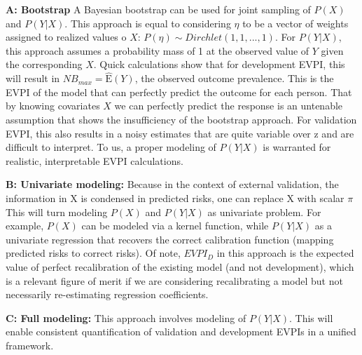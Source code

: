 \documentclass[
]{article}
\begin{document}
\textbf{A: Bootstrap} A Bayesian bootstrap can be used for joint
sampling of \(P(X)\) and \(P(Y|X)\). This approach is equal to
considering \(\eta\) to be a vector of weights assigned to realized
values o \(X\): \(P(\eta)\sim Dirchlet(1,1,...,1)\). For \(P(Y|X)\),
this approach assumes a probability mass of 1 at the observed value of
\(Y\) given the corresponding \(X\). Quick calculations show that for
development EVPI, this will result in \(NB_{max}=\hat{\text{E}}(Y)\),
the observed outcome prevalence. This is the EVPI of the model that can
perfectly predict the outcome for each person. That by knowing
covariates \(X\) we can perfectly predict the response is an untenable
assumption that shows the insufficiency of the bootstrap approach. For
validation EVPI, this also results in a noisy estimates that are quite
variable over z and are difficult to interpret. To us, a proper modeling
of \(P(Y|X)\) is warranted for realistic, interpretable EVPI
calculations.

\textbf{B: Univariate modeling:} Because in the context of external
validation, the information in X is condensed in predicted risks, one
can replace X with scalar \(\pi\) This will turn modeling \(P(X)\) and
\(P(Y|X)\) as univariate problem. For example, \(P(X)\) can be modeled
via a kernel function, while \(P(Y|X)\) as a univariate regression that
recovers the correct calibration function (mapping predicted risks to
correct risks). Of note, \(EVPI_D\) in this approach is the expected
value of perfect recalibration of the existing model (and not
development), which is a relevant figure of merit if we are considering
recalibrating a model but not necessarily re-estimating regression
coefficients.

\textbf{C: Full modeling:} This approach involves modeling of
\(P(Y|X)\). This will enable consistent quantification of validation and
development EVPIs in a unified framework.
\end{document}
